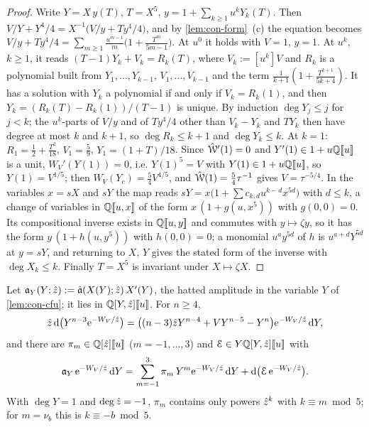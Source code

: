 \begin{proof}
Write $Y=X\,y(T)$, $T=X^5$, $y=1+\sum_{k\geq1}u^kY_k(T)$. Then $V/Y+Y^4/4=X^{-1}\bigl(V/y+Ty^4/4\bigr)$, and by \cref{lem:con-form}~(c) the equation becomes $V/y+Ty^4/4=\sum_{m\geq1}\frac{u^{m-1}}m\bigl(1+\frac{T^m}{5m-1}\bigr)$. At $u^0$ it holds with $V=1$, $y=1$. At $u^k$, $k\geq1$, it reads $(T-1)Y_k+V_k=R_k(T)$, where $V_k:=[u^k]V$ and $R_k$ is a polynomial built from $Y_1,\dots,Y_{k-1}$, $V_1,\dots,V_{k-1}$ and the term $\frac1{k+1}(1+\frac{T^{k+1}}{5k+4})$. It has a solution with $Y_k$ a polynomial if and only if $V_k=R_k(1)$, and then $Y_k=(R_k(T)-R_k(1))/(T-1)$ is unique. By induction $\deg Y_j\leq j$ for $j<k$; the $u^k$-parts of $V/y$ and of $Ty^4/4$ other than $V_k-Y_k$ and $TY_k$ then have degree at most $k$ and $k+1$, so $\deg R_k\leq k+1$ and $\deg Y_k\leq k$. At $k=1$: $R_1=\frac12+\frac{T^2}{18}$, $V_1=\frac59$, $Y_1=(1+T)/18$. Since $\hat{\mathcal{W}}'(1)=0$ and $Y'(1)\in1+u\mathbb{Q}[\![ u ]\!]$ is a unit, $W_V'(Y(1))=0$, i.e. $Y(1)^5=V$ with $Y(1)\in1+u\mathbb{Q}[\![ u ]\!]$, so $Y(1)=V^{1/5}$; then $W_V(Y_c)=\frac54V^{4/5}$, and $\hat{\mathcal{W}}(1)=\frac54\tau^{-1}$ gives $V=\tau^{-5/4}$. In the variables $x=sX$ and $sY$ the map reads $sY=x\bigl(1+\sum c_{k,d}u^{k-d}x^{5d}\bigr)$ with $d\leq k$, a change of variables in $\mathbb{Q}[\![ u,x ]\!]$ of the form $x\,(1+g(u,x^5))$ with $g(0,0)=0$. Its compositional inverse exists in $\mathbb{Q}[\![ u,y ]\!]$ and commutes with $y\mapsto\zeta y$, so it has the form $y\,(1+h(u,y^5))$ with $h(0,0)=0$; a monomial $u^ay^{5d}$ of $h$ is $u^{a+d}Y^{5d}$ at $y=sY$, and returning to $X$, $Y$ gives the stated form of the inverse with $\deg X_k\leq k$. Finally $T=X^5$ is invariant under $X\mapsto\zeta X$.
\end{proof}

\begin{lem}
\label{lem:con-red}
Let $\mathfrak{a}_Y(Y;\hat{z}):=\hat{\mathfrak{a}}(X(Y);\hat{z})\,X'(Y)$, the hatted amplitude in the variable $Y$ of \cref{lem:con-cfu}; it lies in $\mathbb{Q}[Y,\hat{z}][\![ u ]\!]$. For $n\geq4$,
\[
\hat{z}\,\mathrm{d}\bigl(Y^{n-3}\mathrm{e}^{-W_V/\hat{z}}\bigr)=\bigl((n-3)\hat{z} Y^{n-4}+VY^{n-5}-Y^n\bigr)\mathrm{e}^{-W_V/\hat{z}}\,\mathrm{d} Y,
\]
and there are $\pi_m\in\mathbb{Q}[\hat{z}][\![ u ]\!]$ ($m=-1,\dots,3$) and $\mathcal E\in Y\mathbb{Q}[Y,\hat{z}][\![ u ]\!]$ with
\[
\mathfrak{a}_Y\,\mathrm{e}^{-W_V/\hat{z}}\,\mathrm{d} Y=\sum_{m=-1}^{3}\pi_m\,Y^m\mathrm{e}^{-W_V/\hat{z}}\,\mathrm{d} Y+\mathrm{d}\bigl(\mathcal E\,\mathrm{e}^{-W_V/\hat{z}}\bigr).
\]
With $\deg Y=1$ and $\deg\hat{z}=-1$, $\pi_m$ contains only powers $\hat{z}^k$ with $k\equiv m\bmod5$; for $m=\nu_b$ this is $k\equiv-b\bmod5$.
\end{lem}

